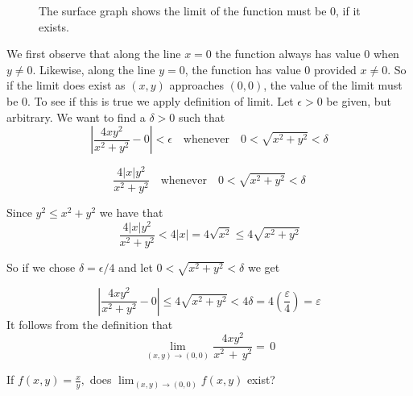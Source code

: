\documentclass[12pt,a4paper]{article}
\begin{document}
\begin{solution}

    \begin{figure}[h]
        \centering
        \caption{The surface graph shows the limit of the function must be 0, if it exists.}
    \end{figure}
        
    We first observe  that along the line \(x=0\) the function always has value 0 when \(y \neq 0\).
    Likewise, along the line \(y=0\), the function has value 0 provided \(x \neq 0\).
    So if the limit does exist as \((x,y)\) approaches \((0,0)\), the value of the limit must be 0. To see if this is true we apply definition of limit.
    Let \(\epsilon > 0\) be given, but arbitrary. We want to find a \(\delta > 0\) such that
    \[\left|{\frac{4x y^{2}}{x^{2}+y^{2}}}-0\right|<\epsilon \quad \text{whenever} \quad  0 < \sqrt{x^2 + y^2} < \delta\]

    \[\frac{4|x|y^{2}}{x^{2}+y^{2}} \quad \text{whenever} \quad  0 < \sqrt{x^2 + y^2} < \delta   \]

    Since \(y^2 \leq x^2 + y^2\) we have that 
    \[\frac{4|x|y^{2}}{x^{2}+y^{2}} < 4|x| = 4 \sqrt{x^2} \leq 4\sqrt{x^2 + y^2}\]

    So if we chose \(\delta = \epsilon \slash 4\) and let \(0 < \sqrt{x^2 + y^2} < \delta\) we get

    \[\left|\frac{4 x y^2}{x^2+y^2}-0\right| \leq 4 \sqrt{x^2+y^2}<4 \delta=4\left(\frac{\varepsilon}{4}\right)=\varepsilon\]
    It follows from the definition that
    \[\operatorname*{lim}_{(x,y)\rightarrow(0,0)}\frac{4x y^{2}}{x^{2}\,+\,y^{2}}=\,0\]


\end{solution}

\newpage

\begin{example}
    If \(f(x,y) = \frac{x}{y},\) does \( \lim_{(x,y) \to (0,0)}f(x,y)\)  exist?
\end{example}
\end{document}

